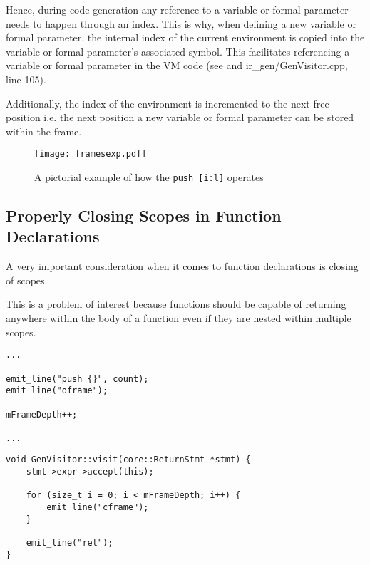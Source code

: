 Hence, during code generation any reference to a variable or
formal parameter needs to happen through an index. This is why,
when defining a new variable or formal parameter, the internal
index of the current environment is copied into the variable or
formal parameter's  associated symbol. This facilitates
referencing a variable or formal parameter in the VM code (see
 and ir\_gen/GenVisitor.cpp, line 105).

Additionally, the index of the environment is incremented to the
next free position i.e. the next position a new variable or
formal parameter can be stored within the frame.

\begin{figure}[H]
\centering
\begin{mdframed}[backgroundcolor=UMPaleRed]
\texttt{[image: framesexp.pdf]}
\end{mdframed}
\caption{A pictorial example of how the \mbox{\texttt{push
[i:l]}} operates}
\label{fig:framesexp}
\end{figure}

\subsection{Properly Closing Scopes in Function Declarations}

A very important consideration when it comes to
function declarations is closing of scopes.

This is a problem of interest because functions should be
capable of returning anywhere within the body of a function even
if they are nested within multiple scopes.

\begin{lstlisting}[caption={A segment of the
\texttt{visit(Program *)} method in the \texttt{GenVisitor}
class (ir\_gen/GenVisitor.cpp)}, label=lst:framedepth]
...

emit_line("push {}", count);
emit_line("oframe");

mFrameDepth++;

...
\end{lstlisting}


\begin{lstlisting}[caption={The \texttt{visit(ReturnStmt *)}
method in the \texttt{GenVisitor} class
(ir\_gen/GenVisitor.cpp)}, label=lst:retstmt]
void GenVisitor::visit(core::ReturnStmt *stmt) {
    stmt->expr->accept(this);

    for (size_t i = 0; i < mFrameDepth; i++) {
        emit_line("cframe");
    }

    emit_line("ret");
}
\end{lstlisting}

